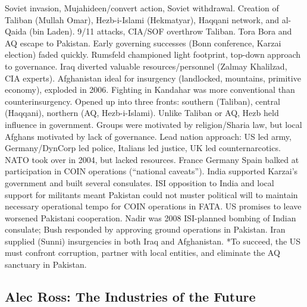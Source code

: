 \documentclass[
]{article}
\begin{document}
Soviet invasion, Mujahideen/convert action, Soviet withdrawal. Creation
of Taliban (Mullah Omar), Hezb-i-Islami (Hekmatyar), Haqqani network,
and al-Qaida (bin Laden). 9/11 attacks, CIA/SOF overthrow Taliban. Tora
Bora and AQ escape to Pakistan. Early governing successes (Bonn
conference, Karzai election) faded quickly. Rumsfeld championed light
footprint, top-down approach to governance. Iraq diverted valuable
resources/personnel (Zalmay Khalilzad, CIA experts). Afghanistan ideal
for insurgency (landlocked, mountains, primitive economy), exploded in
2006. Fighting in Kandahar was more conventional than counterinsurgency.
Opened up into three fronts: southern (Taliban), central (Haqqani),
northern (AQ, Hezb-i-Islami). Unlike Taliban or AQ, Hezb held influence
in government. Groups were motivated by religion/Sharia law, but local
Afghans motivated by lack of governance. Lead nation approach: US led
army, Germany/DynCorp led police, Italians led justice, UK led
counternarcotics. NATO took over in 2004, but lacked resources. France
Germany Spain balked at participation in COIN operations (``national
caveats''). India supported Karzai's government and built several
consulates. ISI opposition to India and local support for militants
meant Pakistan could not muster political will to maintain necessary
operational tempo for COIN operations in FATA. US promises to leave
worsened Pakistani cooperation. Nadir was 2008 ISI-planned bombing of
Indian consulate; Bush responded by approving ground operations in
Pakistan. Iran supplied (Sunni) insurgencies in both Iraq and
Afghanistan. *To succeed, the US must confront corruption, partner with
local entities, and eliminate the AQ sanctuary in Pakistan.

\hypertarget{alec-ross-the-industries-of-the-future}{%
\subsection{Alec Ross: The Industries of the
Future}\label{alec-ross-the-industries-of-the-future}}
\end{document}
